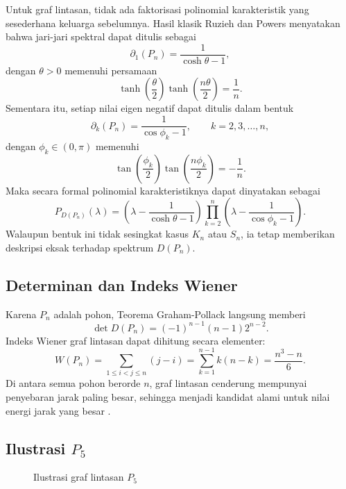 \documentclass[12pt,a4paper]{article}
\begin{document}
Untuk graf lintasan, tidak ada faktorisasi polinomial karakteristik yang sesederhana keluarga sebelumnya. Hasil klasik Ruzieh dan Powers \cite{ruzieh1990distance} menyatakan bahwa jari-jari spektral dapat ditulis sebagai
\[
  \partial_1(P_n)=\frac{1}{\cosh\theta-1},
\]
dengan $\theta>0$ memenuhi persamaan
\[
  \tanh\left(\frac{\theta}{2}\right)
  \tanh\left(\frac{n\theta}{2}\right)=\frac{1}{n}.
\]
Sementara itu, setiap nilai eigen negatif dapat ditulis dalam bentuk
\[
  \partial_k(P_n)=\frac{1}{\cos\phi_k-1},
  \qquad
  k=2,3,\dots,n,
\]
dengan $\phi_k\in(0,\pi)$ memenuhi
\[
  \tan\left(\frac{\phi_k}{2}\right)
  \tan\left(\frac{n\phi_k}{2}\right)=-\frac{1}{n}.
\]
Maka secara formal polinomial karakteristiknya dapat dinyatakan sebagai
\[
  P_{D(P_n)}(\lambda)
  =
  \left(\lambda-\frac{1}{\cosh\theta-1}\right)
  \prod_{k=2}^{n}
  \left(\lambda-\frac{1}{\cos\phi_k-1}\right).
\]
Walaupun bentuk ini tidak sesingkat kasus $K_n$ atau $S_n$, ia tetap memberikan deskripsi eksak terhadap spektrum $D(P_n)$.

\subsection{Determinan dan Indeks Wiener}

Karena $P_n$ adalah pohon, Teorema Graham-Pollack langsung memberi
\[
  \det D(P_n)=(-1)^{n-1}(n-1)2^{n-2}.
\]
Indeks Wiener graf lintasan dapat dihitung secara elementer:
\[
  W(P_n)
  =\sum_{1\le i<j\le n}(j-i)
  =\sum_{k=1}^{n-1}k(n-k)
  =\frac{n^3-n}{6}.
\]
Di antara semua pohon berorde $n$, graf lintasan cenderung mempunyai penyebaran jarak paling besar, sehingga menjadi kandidat alami untuk nilai energi jarak yang besar \cite{merris1990distance, ruzieh1990distance}.

\subsection{Ilustrasi $P_5$}

\begin{figure}[h!]
  \centering
  \caption{Ilustrasi graf lintasan $P_5$}
  \label{fig:p5}
\end{figure}
\end{document}
